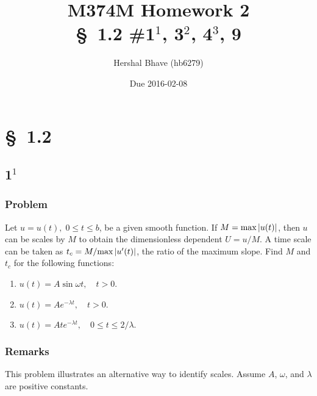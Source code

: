 \documentclass[12pt]{article}
\title{M374M Homework 2 \\
  \normalsize{\S~1.2 \#1$^1$, 3$^2$, 4$^3$, 9}}
\author{Hershal Bhave (hb6279)}
\date{Due 2016-02-08}
\begin{document}
\maketitle

\section{\S~1.2}
\subsection{1$^1$}

\subsubsection*{Problem}
Let $u=u(t),\;0 \le t \le b$, be a given smooth function. If
$M=\text{max}\left|{u(t)}\right|$, then $u$ can be scales by $M$ to obtain the
dimensionless dependent $U=u/M$. A time scale can be taken as
$t_c=M/\text{max}\left|{u'(t)}\right|$, the ratio of the maximum slope. Find $M$ and
$t_c$ for the following functions:
\begin{enumerate}
\item $u(t)=A\sin\omega t, \quad t>0$.
\item $u(t)=Ae^{-\lambda t},\quad t>0$.
\item $u(t)=Ate^{-\lambda t},\quad 0 \le t \le 2/\lambda.$
\end{enumerate}

\subsubsection*{Remarks}
This problem illustrates an alternative way to identify scales. Assume $A$,
$\omega$, and $\lambda$ are positive constants.
\end{document}
